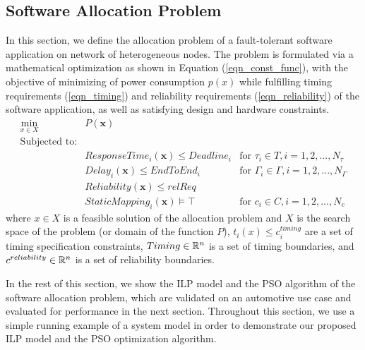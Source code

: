 \subsection{Software Allocation Problem}\label{sec_allocation}
In this section, we define the allocation problem of a fault-tolerant software application on network of heterogeneous nodes. The problem is formulated via a mathematical optimization as shown in Equation (\ref{eqn_const_func}), with the objective of minimizing of power consumption $p(x)$ while fulfilling timing requirements (\ref{eqn_timing}) and reliability requirements (\ref{eqn_reliability}) of the software application, as well as satisfying design and hardware constraints. 
\begin{align}
\label{eqn_optimization}
\min_{x\in X}\;\;& P(\textbf{x}) & \\
\text{Subjected to:} &\\
& ResponseTime_i(\textbf{x}) \leq Deadline_i & \text{for }\tau_i\in T, i=1,2,...,N_\tau \\ 
\label{eqn_e2e}
&Delay_i(\textbf{x}) \leq EndToEnd_i & \text{for }\Gamma_i\in \Gamma, i=1,2,...,N_\Gamma \\
\label{eqn_reliability}
&Reliability(\textbf{x}) \leq relReq\\
\label{eqn_mapping}
&StaticMapping_i(\textbf{x})\models \top & \text{for }c_i\in C, i=1,2,...,N_c
\end{align}
where $x\in X$ is a feasible solution of the allocation problem and 
$X$ is the search space of the problem (or domain of the function $P$), $t_i(x) \leq c^{timing}_i$ are a set of timing specification constraints, $Timing\in \Bbb R^n$ is a set of timing boundaries, and $c^{reliability}\in \Bbb R^n$ is a set of reliability boundaries.

In the rest of this section, we show the ILP model and the PSO algorithm of the software allocation problem, which are validated on an automotive use case and evaluated for performance in the next section. Throughout this section, we use a simple running example of a system model in order to demonstrate our proposed ILP model and the PSO optimization algorithm.

